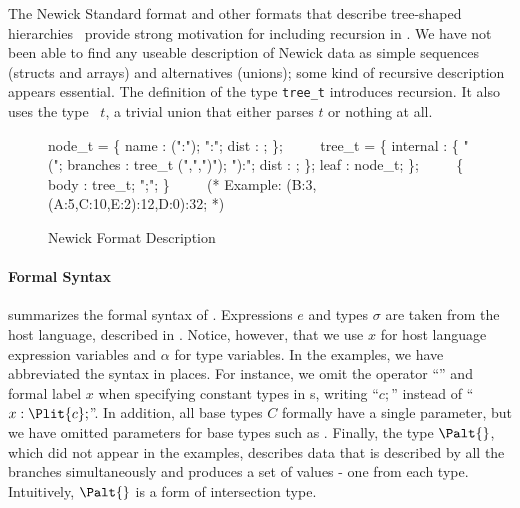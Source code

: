 The Newick Standard format and other formats that describe tree-shaped 
hierarchies~\cite{geneontology,newick-data}
provide strong motivation for including recursion in \ipads.  
We have not been able to find any useable description of Newick data as
simple sequences (structs and arrays) and alternatives (unions); some
kind of recursive description appears essential.
The definition of the type {\tt tree\_t} introduces recursion.
It also uses the type \Popt\ $t$, a trivial union that 
either parses $t$ or nothing at all.


\begin{figure}
{\small
\begin{code}
node\_t = \Popt \Pstruct \{
                name : \Pstring(":"); ":";
                dist : \Puint;  
              \};
\(\qquad\)
\Prec tree\_t = \Punion \{
    internal : \Pstruct \{
        "(";  branches : tree\_t \Parray(",",")");
        "):"; dist : \Puint;
      \};
    leaf : node\_t;
  \};
\(\qquad\)
\Pstruct \{ body : tree\_t; ";"; \}
\(\qquad\)
(* Example: (B:3,(A:5,C:10,E:2):12,D:0):32; *)
\end{code}
\caption{\ipads{} Newick Format Description}
\label{fig:ipads-newick}
}
\end{figure}

\paragraph*{Formal Syntax}
 summarizes the formal syntax of \ipads.
Expressions $e$ and types $\sigma$ are taken from the host language,  
described in . 
Notice, however, that we use $x$ for host
language expression variables and $\alpha$ for \ipads{} type
variables.
In the examples, we have abbreviated the syntax in places.  
For instance, we omit the operator ``'' and formal label 
$x$ when specifying constant types in \Pstruct{}s, writing
``$c;$'' instead of ``$x :
\Plit{c};$''. In addition, all
base types $C$ formally have a single parameter, but we have omitted
parameters for base types such as \Puint.  
Finally, the type $\Palt{}$, which did not appear in the
  examples, describes data that is described by all the branches
  simultaneously and produces a set of values - one from each type.
Intuitively, $\Palt{}$ is a form of intersection type.

